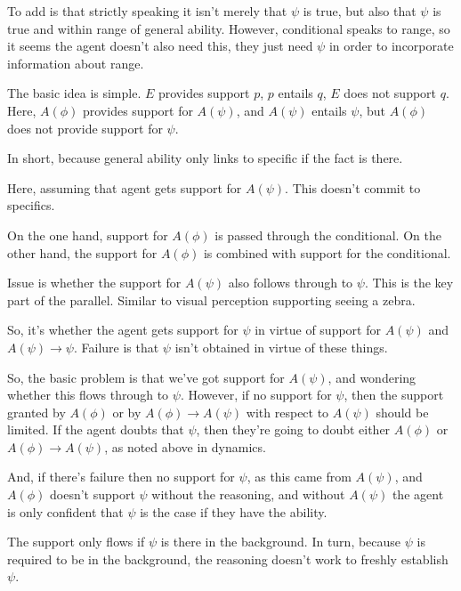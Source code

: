 \documentclass[10pt]{article}
\begin{document}
\begin{note}
  {
    \color{red}
    To add is that strictly speaking it isn't merely that \(\psi\) is true, but also that \(\psi\) is true and within range of general ability.
    However, conditional speaks to range, so it seems the agent doesn't also need this, they just need \(\psi\) in order to incorporate information about range.
  }

  The basic idea is simple.
  \(E\) provides support \(p\), \(p\) entails \(q\), \(E\) does not support \(q\).
  Here, \(A(\phi)\) provides support for \(A(\psi)\), and \(A(\psi)\) entails \(\psi\), but \(A(\phi)\) does not provide support for \(\psi\).

  In short, because general ability only links to specific if the fact is there.

  Here, assuming that agent gets support for \(A(\psi)\).
  This doesn't commit to specifics.

  On the one hand, support for \(A(\phi)\) is passed through the conditional.
  On the other hand, the support for \(A(\phi)\) is combined with support for the conditional.

  Issue is whether the support for \(A(\psi)\) also follows through to \(\psi\).
  This is the key part of the parallel.
  Similar to visual perception supporting seeing a zebra.

  So, it's whether the agent gets support for \(\psi\) in virtue of support for \(A(\psi)\) and \(A(\psi) \rightarrow \psi\).
  Failure is that \(\psi\) isn't obtained in virtue of these things.

  So, the basic problem is that we've got support for \(A(\psi)\), and wondering whether this flows through to \(\psi\).
  However, if no support for \(\psi\), then the support granted by \(A(\phi)\) or by \(A(\phi) \rightarrow A(\psi)\) with respect to \(A(\psi)\) should be limited.
  If the agent doubts that \(\psi\), then they're going to doubt either \(A(\phi)\) or \(A(\phi) \rightarrow A(\psi)\), as noted above in dynamics.

  And, if there's failure then no support for \(\psi\), as this came from \(A(\psi)\), and \(A(\phi)\) doesn't support \(\psi\) without the reasoning, and without \(A(\psi)\) the agent is only confident that \(\psi\) is the case if they have the ability.

  The support only flows if \(\psi\) is there in the background.
  In turn, because \(\psi\) is required to be in the background, the reasoning doesn't work to freshly establish \(\psi\).
\end{note}
\end{document}
